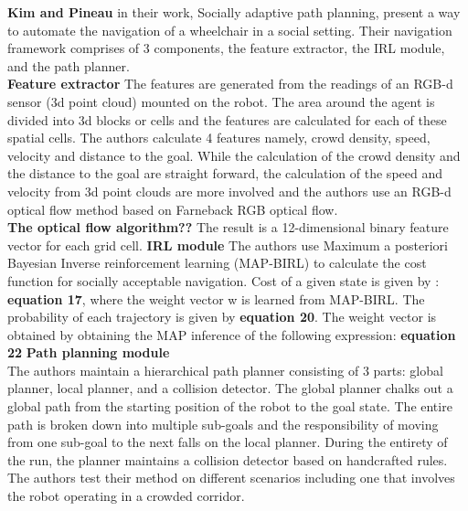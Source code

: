\textbf{Kim and Pineau} in their work, Socially adaptive path planning, present a way to automate the navigation of a wheelchair in a social setting. Their navigation framework comprises of 3 components, the feature extractor, the IRL module, and the path planner.\\
\textbf{Feature extractor}
The features are generated from the readings of an RGB-d sensor (3d point cloud) mounted on the robot. The area around the agent is divided into 3d blocks or cells and the features are calculated for each of these spatial cells. 
The authors calculate 4 features namely,
crowd density, speed, velocity and distance to the goal.
While the calculation of the crowd density and the distance to the goal are straight forward, the calculation of the speed and velocity from 3d point clouds are more involved and the authors use an RGB-d optical flow method based on Farneback RGB optical flow. 
\\ \textbf{The optical flow algorithm??}
The result is a 12-dimensional binary feature vector for each grid cell.
\textbf{IRL module}
The authors use Maximum a posteriori Bayesian Inverse reinforcement learning (MAP-BIRL) to calculate the cost function for socially acceptable navigation. Cost of a given state is given by :
\textbf{equation 17}, where the weight vector w is learned from MAP-BIRL. 
The probability of each trajectory is given by \textbf{equation 20}. The weight vector is obtained by obtaining the MAP inference of the following expression:
\textbf{equation 22}
\textbf{Path planning module}
\\
The authors maintain a hierarchical path planner consisting of 3 parts: global planner, local planner, and a collision detector.
The global planner chalks out a global path from the starting position of the robot to the goal state. The entire path is broken down into multiple sub-goals and the responsibility of moving from one sub-goal to the next falls on the local planner. During the entirety of the run, the planner maintains a collision detector based on handcrafted rules.\\
The authors test their method on different scenarios including one that involves the robot operating in a crowded corridor.

